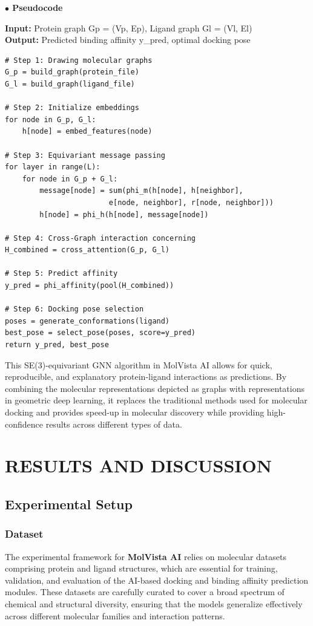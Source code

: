 \documentclass[12pt,a4]{report}
\begin{document}
\vspace{0.3cm}
\noindent\textbf{\large $\bullet$ Pseudocode}
\begin{flushleft}
\textbf{Input:} Protein graph Gp = (Vp, Ep), Ligand graph Gl = (Vl, El) \\
\textbf{Output:} Predicted binding affinity y\_pred, optimal docking pose
\end{flushleft}

\begin{verbatim}
# Step 1: Drawing molecular graphs
G_p = build_graph(protein_file)
G_l = build_graph(ligand_file)

# Step 2: Initialize embeddings
for node in G_p, G_l:
    h[node] = embed_features(node)

# Step 3: Equivariant message passing
for layer in range(L):
    for node in G_p + G_l:
        message[node] = sum(phi_m(h[node], h[neighbor],
                        e[node, neighbor], r[node, neighbor]))
        h[node] = phi_h(h[node], message[node])

# Step 4: Cross-Graph interaction concerning
H_combined = cross_attention(G_p, G_l)

# Step 5: Predict affinity
y_pred = phi_affinity(pool(H_combined))

# Step 6: Docking pose selection
poses = generate_conformations(ligand)
best_pose = select_pose(poses, score=y_pred)
return y_pred, best_pose
\end{verbatim}

\vspace{0.3cm}
\hspace{0.3in}
This SE(3)-equivariant GNN algorithm in MolVista AI allows for quick, reproducible, and explanatory protein-ligand interactions as predictions. By combining the molecular representations depicted as graphs with representations in geometric deep learning, it replaces the traditional methods used for molecular docking and provides speed-up in molecular discovery while providing high-confidence results across different types of data.

 \chapter{RESULTS AND DISCUSSION}

\section{Experimental Setup}

\subsection{Dataset}
\hspace{0.3in}
The experimental framework for \textbf{MolVista AI} relies on molecular datasets comprising protein and ligand structures, which are essential for training, validation, and evaluation of the AI-based docking and binding affinity prediction modules. These datasets are carefully curated to cover a broad spectrum of chemical and structural diversity, ensuring that the models generalize effectively across different molecular families and interaction patterns.\\
\end{document}
